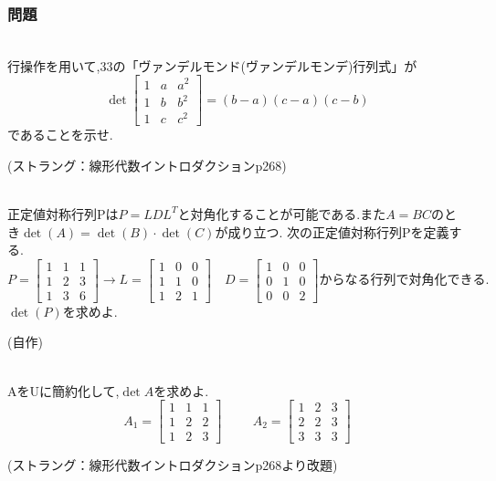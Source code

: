 \subsubsection{問題}
\noindent
{}\\
行操作を用いて,3\times 3の「ヴァンデルモンド(ヴァンデルモンデ)行列式」が\\
\[\det
\begin{bmatrix}
    1 & a & a^2 \\
    1 & b & b^2 \\
    1 & c & c^2
\end{bmatrix}=(b-a)(c-a)(c-b)\]
であることを示せ.
\begin{flushright}
    (ストラング：線形代数イントロダクションp268)
\end{flushright}
\\
正定値対称行列Pは$P=LDL^T$と対角化することが可能である.また$A=BC$のとき$\det(A)=\det(B)\cdot\det(C)$が成り立つ.
次の正定値対称行列Pを定義する.\\
\[
P=
\begin{bmatrix}
    1 & 1 & 1 \\
    1 & 2 & 3 \\
    1 & 3 & 6
\end{bmatrix}\rightarrow
L=
\begin{bmatrix}
    1 & 0 & 0 \\
    1 & 1 & 0 \\
    1 & 2 & 1
\end{bmatrix}\quad D=
\begin{bmatrix}
    1 & 0 & 0 \\
    0 & 1 & 0 \\
    0 & 0 & 2
\end{bmatrix}からなる行列で対角化できる.\]
$\det(P)$を求めよ.
\begin{flushright}
    (自作)
\end{flushright}
\\
AをUに簡約化して,$\det A$を求めよ.\\
\[A_1=
\begin{bmatrix}
    1 & 1 & 1 \\
    1 & 2 & 2 \\
    1 & 2 & 3
\end{bmatrix}\hspace{1cm}A_2=
\begin{bmatrix}
    1 & 2 & 3 \\
    2 & 2 & 3 \\
    3 & 3 & 3
\end{bmatrix}\]
\begin{flushright}
    (ストラング：線形代数イントロダクションp268より改題)
\end{flushright}
